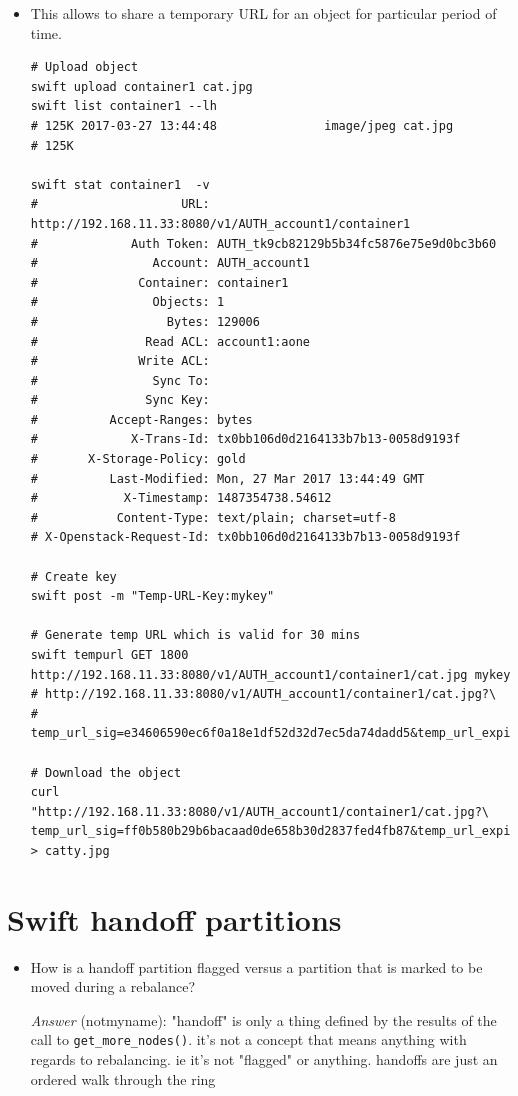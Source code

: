 \documentclass{article}
\begin{document}
\begin{itemize}
\item This allows to share a temporary URL for an object for particular
period of time.

\begin{verbatim}
# Upload object
swift upload container1 cat.jpg
swift list container1 --lh
# 125K 2017-03-27 13:44:48               image/jpeg cat.jpg
# 125K

swift stat container1  -v
#                    URL: http://192.168.11.33:8080/v1/AUTH_account1/container1
#             Auth Token: AUTH_tk9cb82129b5b34fc5876e75e9d0bc3b60
#                Account: AUTH_account1
#              Container: container1
#                Objects: 1
#                  Bytes: 129006
#               Read ACL: account1:aone
#              Write ACL:
#                Sync To:
#               Sync Key:
#          Accept-Ranges: bytes
#             X-Trans-Id: tx0bb106d0d2164133b7b13-0058d9193f
#       X-Storage-Policy: gold
#          Last-Modified: Mon, 27 Mar 2017 13:44:49 GMT
#            X-Timestamp: 1487354738.54612
#           Content-Type: text/plain; charset=utf-8
# X-Openstack-Request-Id: tx0bb106d0d2164133b7b13-0058d9193f

# Create key
swift post -m "Temp-URL-Key:mykey"

# Generate temp URL which is valid for 30 mins
swift tempurl GET 1800 http://192.168.11.33:8080/v1/AUTH_account1/container1/cat.jpg mykey
# http://192.168.11.33:8080/v1/AUTH_account1/container1/cat.jpg?\
# temp_url_sig=e34606590ec6f0a18e1df52d32d7ec5da74dadd5&temp_url_expires=1490624622

# Download the object
curl "http://192.168.11.33:8080/v1/AUTH_account1/container1/cat.jpg?\
temp_url_sig=ff0b580b29b6bacaad0de658b30d2837fed4fb87&temp_url_expires=1490624309" > catty.jpg
\end{verbatim}
\end{itemize}

\section{Swift handoff partitions}
\label{sec:orgf282475}
\begin{itemize}
\item How is a handoff partition flagged versus a partition that is
marked to be moved during a rebalance?

\emph{Answer} (notmyname): "handoff" is only a thing defined by the
results of the call to \texttt{get\_more\_nodes()}. it's not a concept
that means anything with regards to rebalancing. ie it's not
"flagged" or anything. handoffs are just an ordered walk through
the ring
\end{itemize}
\end{document}
